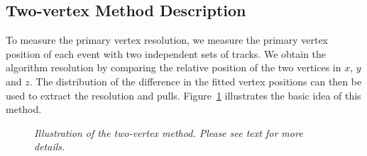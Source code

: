 \subsection{Two-vertex Method Description}
\label{sub:twovertex}

To measure the primary vertex resolution, we measure the primary vertex 
position of each event with two independent sets of tracks. 
We obtain the algorithm resolution by comparing the 
relative position of the two vertices in $x$, $y$ and $z$. 
The distribution of the difference in the fitted vertex positions 
can then be used to extract the resolution and pulls. 
Figure~\ref{fig:splitcartoon} illustrates the basic idea of this method.
\begin{figure}[htb]
\begin{center}
\centerline{
}
\caption{\sl
Illustration of the two-vertex method. Please see text for more details.
}
\label{fig:splitcartoon}
\end{center}
\end{figure}

